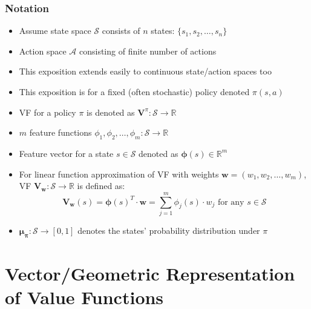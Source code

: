 \documentclass[handout]{beamer}
\newcommand{\vw}{\bm{V_w}}
\newcommand{\vpi}{\bm{V}^{\pi}}
\newcommand{\bmu}{\bm{\mu_{\pi}}}
\newcommand{\bw}{\bm{w}}
\begin{document}
\begin{frame}
\frametitle{Notation}
\pause
\begin{itemize}[<+->]
\item Assume state space $\mathcal{S}$ consists of $n$ states: $\{s_1, s_2, \ldots, s_n\}$
\item Action space $\mathcal{A}$ consisting of finite number of actions
\item This exposition extends easily to continuous state/action spaces too
\item This exposition is for a fixed (often stochastic) policy denoted $\pi(s,a)$
\item VF for a policy $\pi$ is denoted as $\vpi: \mathcal{S} \rightarrow \mathbb{R}$
\item $m$ feature functions $\phi_1, \phi_2, \ldots, \phi_m : \mathcal{S} \rightarrow \mathbb{R}$
\item Feature vector for a state $s \in \mathcal{S}$ denoted as $\bm{\phi}(s) \in \mathbb{R}^m$
\item For linear function approximation of VF with weights $\bw = (w_1, w_2, \ldots, w_m)$,
VF $\vw: \mathcal{S} \rightarrow \mathbb{R}$ is defined as:
$$\vw(s) = \bm{\phi}(s)^T \cdot \bw =  \sum_{j=1}^m \phi_j(s) \cdot w_j \mbox{ for any } s \in \mathcal{S}$$
\item $\bmu : \mathcal{S} \rightarrow [0, 1]$ denotes the states' probability distribution under $\pi$ 
\end{itemize}
\end{frame}

\section{Vector/Geometric Representation of Value Functions}
\end{document}
